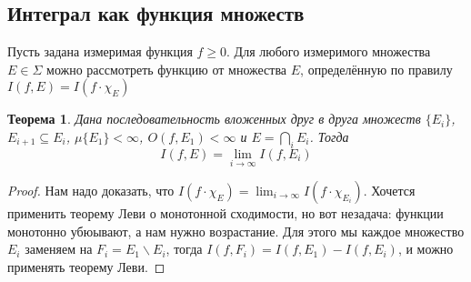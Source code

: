\documentclass[a4paper]{article}
\theoremstyle{indented}
\newtheorem{theorem}{Теорема}
\theoremstyle{definition}
\theoremstyle{remark}
\DeclareMathOperator{\ra}{\rightarrow}
\begin{document}
\subsection{Интеграл как функция множеств}
Пусть задана измеримая функция $f \geq 0$. Для любого измеримого множества $E \in \Sigma$ можно рассмотреть функцию от множества $E$, определённую по правилу $I(f, E) = I(f \cdot \chi_E)$
\\
\begin{theorem}
Дана последовательность вложенных друг в друга множеств $\{E_i\}$, $E_{i+1} \subseteq E_i$, $\mu\{E_1\} < \infty$, $O(f, E_1)<\infty$ и $E=\bigcap_i E_i$. Тогда $$I(f, E) = \lim_{i \ra \infty} I(f, E_i)$$
\end{theorem}
\begin{proof}
Нам надо доказать, что $I(f \cdot \chi_E) = \lim_{i \ra \infty} I(f \cdot \chi_{E_i})$. Хочется применить теорему Леви о монотонной сходимости, но вот незадача: функции монотонно убюывают, а нам нужно возрастание. Для этого мы каждое множество $E_i$ заменяем на $F_i = E_1 \backslash E_i$, тогда $I(f, F_i) = I(f, E_1)-I(f, E_i)$, и можно применять теорему Леви.
\end{proof}
\end{document}
